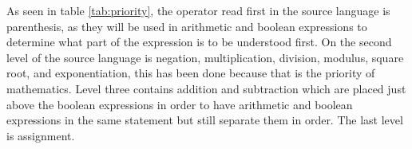 As seen in table \ref{tab:priority}, the operator read first in the source language is parenthesis, as they will be used in arithmetic and boolean expressions to determine what part of the expression is to be understood first. On the second level of the source language is negation, multiplication, division, modulus, square root, and exponentiation, this has been done because that is the priority of mathematics. Level three contains addition and subtraction which are placed just above the boolean expressions in order to have arithmetic and boolean expressions in the same statement but still separate them in order. The last level is assignment. 